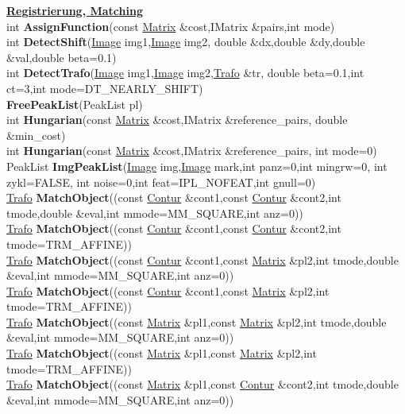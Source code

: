 \documentclass[10pt,titlepage]{article}
\newcommand{\subtitle}[1]{{\noindent\bf#1}}
\def\functionlistentry#1#2#3#4#5#6{\noindent #1 {\bf #2}(#3) \dotfill #6\\}
\begin{document}
{{\subtitle{\hyperlink{SECTION:registration}{Registrierung, Matching}}\\
\functionlistentry{int}{AssignFunction}{const \hyperlink{Matrix}{Matrix} \&cost,IMatrix \&pairs,int mode}{1261}{registration}{}
\functionlistentry{int}{DetectShift}{\hyperlink{Image}{Image} img1,\hyperlink{Image}{Image} img2, double \&dx,double \&dy,double \&val,double beta=0.1}{1252}{registration}{}
\functionlistentry{int}{DetectTrafo}{\hyperlink{Image}{Image} img1,\hyperlink{Image}{Image} img2,\hyperlink{Trafo}{Trafo} \&tr, double beta=0.1,int ct=3,int mode=DT\_NEARLY\_SHIFT}{1253}{registration}{}
\functionlistentry{}{FreePeakList}{PeakList pl}{1260}{registration}{}
\functionlistentry{int}{Hungarian}{const \hyperlink{Matrix}{Matrix} \&cost,IMatrix \&reference\_pairs, double \&min\_cost}{1263}{registration}{}
\functionlistentry{int}{Hungarian}{const \hyperlink{Matrix}{Matrix} \&cost,IMatrix \&reference\_pairs, int mode=0}{1264}{registration}{}
\functionlistentry{PeakList}{ImgPeakList}{\hyperlink{Image}{Image} img,\hyperlink{Image}{Image} mark,int panz=0,int mingrw=0, int zykl=FALSE, int noise=0,int feat=IPL\_NOFEAT,int gnull=0}{1258}{registration}{}
\functionlistentry{\hyperlink{Trafo}{Trafo}}{MatchObject}{(const \hyperlink{Contur}{Contur} \&cont1,const \hyperlink{Contur}{Contur} \&cont2,int tmode,double \&eval,int mmode=MM\_SQUARE,int anz=0)}{1266}{registration}{}
\functionlistentry{\hyperlink{Trafo}{Trafo}}{MatchObject}{(const \hyperlink{Contur}{Contur} \&cont1,const \hyperlink{Contur}{Contur} \&cont2,int tmode=TRM\_AFFINE)}{1267}{registration}{}
\functionlistentry{\hyperlink{Trafo}{Trafo}}{MatchObject}{(const \hyperlink{Contur}{Contur} \&cont1,const \hyperlink{Matrix}{Matrix} \&pl2,int tmode,double \&eval,int mmode=MM\_SQUARE,int anz=0)}{1268}{registration}{}
\functionlistentry{\hyperlink{Trafo}{Trafo}}{MatchObject}{(const \hyperlink{Contur}{Contur} \&cont1,const \hyperlink{Matrix}{Matrix} \&pl2,int tmode=TRM\_AFFINE)}{1269}{registration}{}
\functionlistentry{\hyperlink{Trafo}{Trafo}}{MatchObject}{(const \hyperlink{Matrix}{Matrix} \&pl1,const \hyperlink{Matrix}{Matrix} \&pl2,int tmode,double \&eval,int mmode=MM\_SQUARE,int anz=0)}{1270}{registration}{}
\functionlistentry{\hyperlink{Trafo}{Trafo}}{MatchObject}{(const \hyperlink{Matrix}{Matrix} \&pl1,const \hyperlink{Matrix}{Matrix} \&pl2,int tmode=TRM\_AFFINE)}{1271}{registration}{}
\functionlistentry{\hyperlink{Trafo}{Trafo}}{MatchObject}{(const \hyperlink{Matrix}{Matrix} \&pl1,const \hyperlink{Contur}{Contur} \&cont2,int tmode,double \&eval,int mmode=MM\_SQUARE,int anz=0)}{1272}{registration}{}
}}
\end{document}
